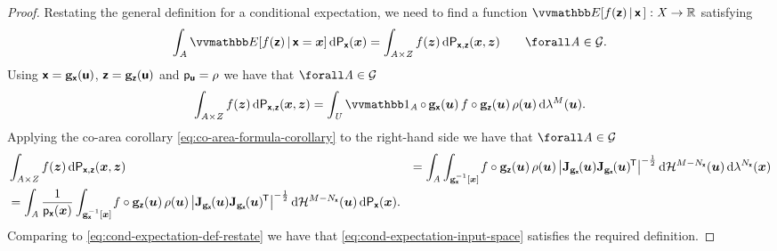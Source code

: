 \begin{proof}
Restating the general definition for a conditional expectation, we need to find a function $\expc{f(\rvct{z}) \gvn \rvct{x}\,} : \set{X} \to \reals$ satisfying
\begin{equation}\label{eq:cond-expectation-def-restate}
  \int_{\set{A}}
    \expc{f(\rvct{z}) \gvn \rvct{x} = \vct{x}} 
  \,\dr\prob{\rvct{x}}(\vct{x}) =
  \int_{\set{A} \times \set{Z}}
    f(\vct{z}) 
  \,\dr\prob{\rvct{x},\rvct{z}}(\vct{x},\vct{z})
  \qquad\forall\set{A} \in \sset{G}.
\end{equation}
Using $\boldsymbol{\mathsf{x}} = {\mathbf{g}}_{\boldsymbol{\mathsf{x}}}(\boldsymbol{\mathsf{u}})$, $\boldsymbol{\mathsf{z}} = {\mathbf{g}}_{\boldsymbol{\mathsf{z}}}(\boldsymbol{\mathsf{u}})$ and $\mathsf{p}_{\boldsymbol{\mathsf{u}}} = \rho$ we have that $\forall\set{A} \in \sset{G}$
\begin{equation}
  \int_{\set{A} \times \set{Z}}
    f(\vct{z}) 
  \,\dr\prob{\rvct{x},\rvct{z}}(\vct{x},\vct{z}) =
  \int_{\set{U}}
  \ind{\set{A}}\circ\,\genfunc_{\rvct{x}}(\vct{u})\,
  f\circ\genfunc_{\rvct{z}}(\vct{u})\,
  \rho(\vct{u})
  \,\dr\lebm{M}(\vct{u}).
\end{equation}
Applying the co-area corollary \eqref{eq:co-area-formula-corollary} to the right-hand side we have that $\forall \set{A} \in\sset{G}$
\begin{align}
  &\int_{\set{A} \times \set{Z}}
    f(\vct{z}) 
  \,\dr\prob{\rvct{x},\rvct{z}}(\vct{x},\vct{z})
  &=
  \int_{\set{A}}
  \int_{\preimage{\genfunc_{\rvct{x}}}{\vct{x}}}\kern-1pt
   f\circ\genfunc_{\rvct{z}}(\vct{u})\,
   \rho(\vct{u})\,
    \left|
      \jacob{\genfunc_{\rvct{x}}}{\vct{u}}
      \jacob{\genfunc_{\rvct{x}}}{\vct{u}}\phantom{}\tr
    \right|^{-\frac{1}{2}}
  \,\dr\haum{M-{N_{\rvct{x}}}}(\vct{u})
  \,\dr\lebm{N_{\rvct{x}}}(\vct{x})
  \\
  &=
  \int_{\set{A}}
  \frac{1}{\pden{\rvct{x}}(\vct{x})}
  \int_{\preimage{\genfunc_{\rvct{x}}}{\vct{x}}}\kern-1pt
   f\circ\genfunc_{\rvct{z}}(\vct{u})\,
   \rho(\vct{u})\,
    \left|
      \jacob{\genfunc_{\rvct{x}}}{\vct{u}}
      \jacob{\genfunc_{\rvct{x}}}{\vct{u}}\phantom{}\tr
    \right|^{-\frac{1}{2}}
  \,\dr\haum{M-{N_{\rvct{x}}}}(\vct{u})
  \,\dr\prob{\rvct{x}}(\vct{x}).
\end{align}
Comparing to \eqref{eq:cond-expectation-def-restate} we have that \eqref{eq:cond-expectation-input-space} satisfies the required definition. \qedhere
\end{proof}

